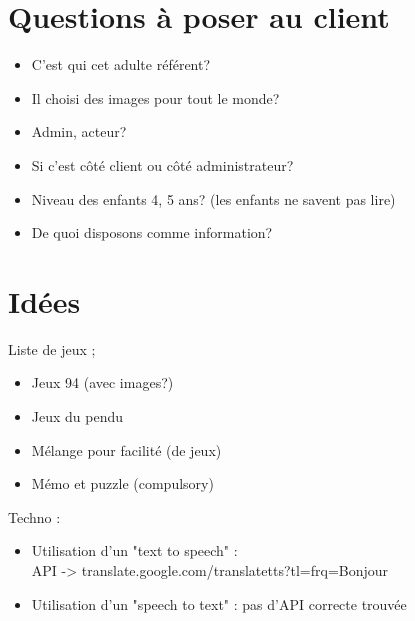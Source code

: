 \documentclass[12pt,a4paper]{report}
\begin{document}
\chapter{Questions à poser au client}

\begin{itemize}
\item C'est qui cet adulte référent? 
\item Il choisi des images pour tout le monde?
\item Admin, acteur? 
\item Si c'est côté client ou côté administrateur? 
\item Niveau des enfants 4, 5 ans? (les enfants ne savent pas lire)
\item De quoi disposons comme information?
\end{itemize}

\chapter{Idées}

Liste de jeux ;
\begin{itemize}
\item Jeux 94 (avec images?)
\item Jeux du pendu
\item Mélange pour facilité (de jeux)
\item Mémo et puzzle (compulsory)
\end{itemize}

Techno :
\begin{itemize}
\item Utilisation d'un "text to speech" : \\API -> translate.google.com/translatetts?tl=frq=Bonjour
\item Utilisation d'un "speech to text" : pas d'API correcte trouvée
\end{itemize}





\end{document}
